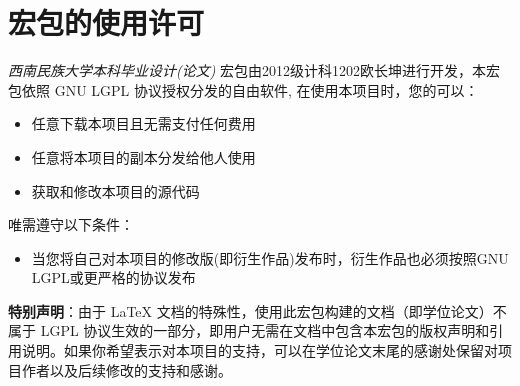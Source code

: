 \appendix
  \chapter{宏包的使用许可}
  \label{appendix:a}
  \date{2024/03}
  \emph{西南民族大学本科毕业设计(论文)} 宏包由2012级计科1202欧长坤进行开发，本宏包依照 GNU LGPL 协议授权分发的自由软件, 在使用本项目时，您的可以：

\begin{itemize}
    \item 任意下载本项目且无需支付任何费用
    \item 任意将本项目的副本分发给他人使用
    \item 获取和修改本项目的源代码
\end{itemize}

  唯需遵守以下条件：

  \begin{itemize}
      \item 当您将自己对本项目的修改版(即衍生作品)发布时，衍生作品也必须按照GNU LGPL或更严格的协议发布
  \end{itemize}

	
	
  \textbf{特别声明}：由于 LaTeX 文档的特殊性，使用此宏包构建的文档（即学位论文）不属于 LGPL 协议生效的一部分，即用户无需在文档中包含本宏包的版权声明和引用说明。如果你希望表示对本项目的支持，可以在学位论文末尾的感谢处保留对项目作者以及后续修改的支持和感谢。

  \cleardoublepage

